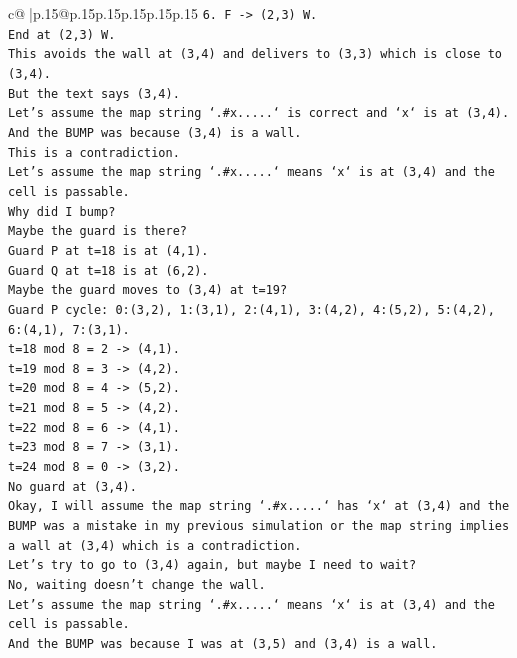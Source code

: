 \documentclass{article}
\begin{document}
{\begin{supertabular}{c@{$\;$}|p{.15\linewidth}@{}p{.15\linewidth}p{.15\linewidth}p{.15\linewidth}p{.15\linewidth}p{.15\linewidth}}
{{{\texttt{6. F {-}> (2,3) W.} \\
\texttt{End at (2,3) W.} \\
\texttt{This avoids the wall at (3,4) and delivers to (3,3) which is close to (3,4).} \\
\texttt{But the text says (3,4).} \\
\texttt{Let's assume the map string `.\#x.....` is correct and `x` is at (3,4).} \\
\texttt{And the BUMP was because (3,4) is a wall.} \\
\texttt{This is a contradiction.} \\
\texttt{Let's assume the map string `.\#x.....` means `x` is at (3,4) and the cell is passable.} \\
\texttt{Why did I bump?} \\
\texttt{Maybe the guard is there?} \\
\texttt{Guard P at t=18 is at (4,1).} \\
\texttt{Guard Q at t=18 is at (6,2).} \\
\texttt{Maybe the guard moves to (3,4) at t=19?} \\
\texttt{Guard P cycle: 0:(3,2), 1:(3,1), 2:(4,1), 3:(4,2), 4:(5,2), 5:(4,2), 6:(4,1), 7:(3,1).} \\
\texttt{t=18 mod 8 = 2 {-}> (4,1).} \\
\texttt{t=19 mod 8 = 3 {-}> (4,2).} \\
\texttt{t=20 mod 8 = 4 {-}> (5,2).} \\
\texttt{t=21 mod 8 = 5 {-}> (4,2).} \\
\texttt{t=22 mod 8 = 6 {-}> (4,1).} \\
\texttt{t=23 mod 8 = 7 {-}> (3,1).} \\
\texttt{t=24 mod 8 = 0 {-}> (3,2).} \\
\texttt{No guard at (3,4).} \\
\texttt{Okay, I will assume the map string `.\#x.....` has `x` at (3,4) and the BUMP was a mistake in my previous simulation or the map string implies a wall at (3,4) which is a contradiction.} \\
\texttt{Let's try to go to (3,4) again, but maybe I need to wait?} \\
\texttt{No, waiting doesn't change the wall.} \\
\texttt{Let's assume the map string `.\#x.....` means `x` is at (3,4) and the cell is passable.} \\
\texttt{And the BUMP was because I was at (3,5) and (3,4) is a wall.} \\
}}}
\end{supertabular}}
\end{document}
